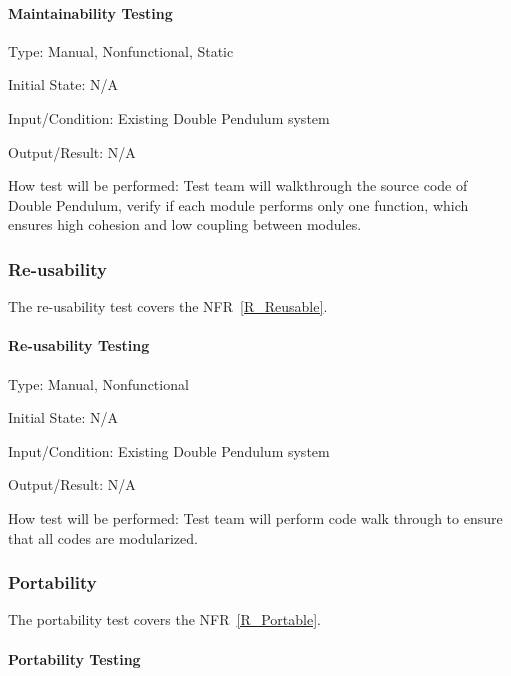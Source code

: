 \documentclass[12pt, titlepage]{article}
\begin{document}
\paragraph{Maintainability Testing\\} 

Type: Manual, Nonfunctional, Static
          
Initial State: N/A
          
Input/Condition: Existing Double Pendulum system
          
Output/Result: N/A
          
How test will be performed: Test team will walkthrough the source code of Double Pendulum, verify if each module performs only one function, which ensures high cohesion and low coupling between modules.  

\subsubsection{Re-usability}\label{ReuseTest}
The re-usability test covers the NFR~\ref{R_Reusable}. 

\paragraph{Re-usability Testing\\}
Type: Manual, Nonfunctional

Initial State: N/A
          
Input/Condition: Existing Double Pendulum system
          
Output/Result: N/A
          
How test will be performed: Test team will perform code walk through to ensure
that all codes are modularized. 

\subsubsection{Portability} \label{PortTest}
The portability test covers the NFR~\ref{R_Portable}.

\paragraph{Portability Testing\\}
\end{document}

